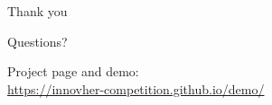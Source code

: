 \documentclass[
aspectratio=169,	%
english,			%
]{DEEclassP}
\begin{document}
\begin{frame}[noframenumbering]
  \centering
  \vfill
  {\Huge\color{DEEblue} Thank you}\par
  \vspace{0.4cm}
  {\large Questions?}\par
  \vspace{0.6cm}
  \href{https://innovher-competition.github.io/demo/}{%
    }\par
  \vspace{0.25cm}
  {\footnotesize Project page and demo:\\[2pt]\url{https://innovher-competition.github.io/demo/}}
  \vfill
\end{frame}


\end{document}
